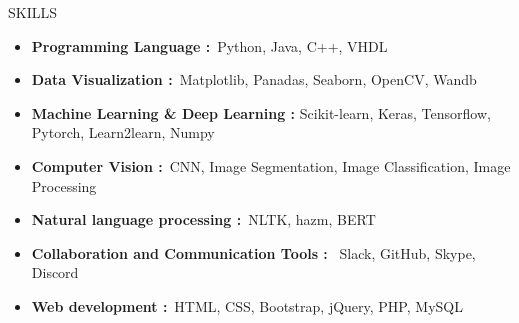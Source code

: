 \documentclass[]{CV}
\begin{document}
\vspace{-6mm}
\begin{section}{SKILLS}
    \begin{itemize}
        \item \textbf{Programming Language :}~Python, Java, C++, VHDL
        \item \textbf{Data Visualization :}~Matplotlib, Panadas, Seaborn, OpenCV, Wandb
        \item \textbf{Machine Learning \& Deep Learning :} Scikit-learn, Keras, Tensorflow, Pytorch, Learn2learn, Numpy
        \item \textbf{Computer Vision :}~CNN, Image Segmentation, Image Classification, Image Processing
        \item \textbf{Natural language processing :}~NLTK, hazm, BERT
        \item \textbf{Collaboration and Communication Tools : }~Slack, GitHub, Skype, Discord
	\item \textbf{Web development :}~HTML, CSS, Bootstrap, jQuery, PHP,  MySQL
    \end{itemize}
\end{section}
\end{document}
